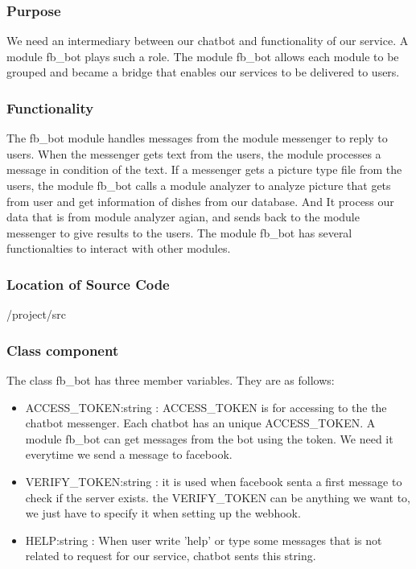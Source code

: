 \subsubsection {Purpose}

We need an intermediary between our chatbot and functionality of our service. A module fb\_bot plays such a role. The module fb\_bot allows each module to be grouped and became a bridge that enables our services to be delivered to users. \newline


\subsubsection {Functionality}

The fb\_bot module handles messages from the module messenger to reply to users. When the messenger gets text from the users, the module processes a message in condition of the text. If a messenger gets a picture type file from the users, the module fb\_bot calls a module analyzer to analyze picture that gets from user and get information of dishes from our database. And It process our data that is from module analyzer agian, and sends back to the module messenger to give results to the users. The module fb\_bot has several functionalties to interact with other modules. \newline


\subsubsection {Location of Source Code}

/project/src \newline


\subsubsection {Class component}

The class fb\_bot has three member variables. They are as follows:\newline

\begin{itemize}
\item ACCESS\_TOKEN:string : ACCESS\_TOKEN is for accessing to the the chatbot messenger. Each chatbot has an unique ACCESS\_TOKEN. A module fb\_bot can get messages from the bot using the token. We need it everytime we send a message to facebook. \newline
\item VERIFY\_TOKEN:string : it is used when facebook senta a first message to check if the server exists. the VERIFY\_TOKEN can be anything we want to, we just have to specify it when setting up the webhook. \newline
\item HELP:string : When user write 'help' or type some messages that is not related to request for our service, chatbot sents this string.
\end{itemize} 

